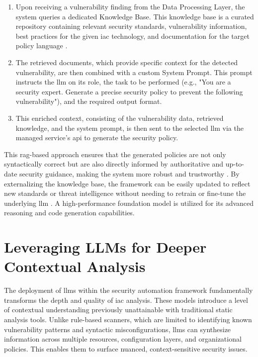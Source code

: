 \begin{enumerate}
\item Upon receiving a vulnerability finding from the Data Processing Layer, the system queries a dedicated Knowledge Base. This knowledge base is a curated repository containing relevant security standards, vulnerability information, best practices for the given \gls{iac} technology, and documentation for the target policy language \cite{ozgur_simple_2024}.
\item The retrieved documents, which provide specific context for the detected vulnerability, are then combined with a custom System Prompt. This prompt instructs the \gls{llm} on its role, the task to be performed (e.g., "You are a security expert. Generate a precise security policy to prevent the following vulnerability"), and the required output format.
\item This enriched context, consisting of the vulnerability data, retrieved knowledge, and the system prompt, is then sent to the selected \gls{llm} via the managed service's \gls{api} to generate the security policy.
\end{enumerate}

This \gls{rag}-based approach ensures that the generated policies are not only syntactically correct but are also directly informed by authoritative and up-to-date security guidance, making the system more robust and trustworthy \cite{noauthor_ground_nodate}. By externalizing the knowledge base, the framework can be easily updated to reflect new standards or threat intelligence without needing to retrain or fine-tune the underlying \gls{llm} \cite{ozgur_simple_2024}. A high-performance foundation model is utilized for its advanced reasoning and code generation capabilities.

\section{Leveraging LLMs for Deeper Contextual Analysis} %
\label{sec:Leveraging LLMs for Deeper Contextual Analysis}

The deployment of \glspl{llm} within the security automation framework fundamentally transforms the depth and quality of \gls{iac} analysis. These models introduce a level of contextual understanding previously unattainable with traditional static analysis tools. Unlike rule-based scanners, which are limited to identifying known vulnerability patterns and syntactic misconfigurations, \glspl{llm} can synthesize information across multiple resources, configuration layers, and organizational policies. This enables them to surface nuanced, context-sensitive security issues.

